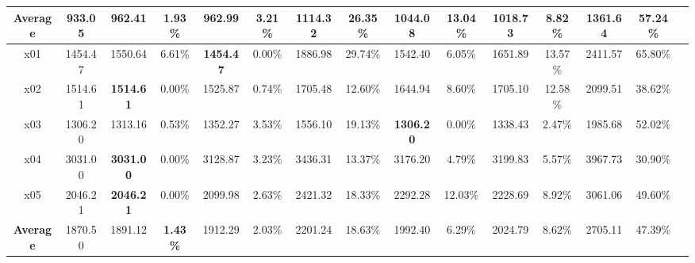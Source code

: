 \begin{table}[h]
{\begin{tabular}{ccccccccccccccc}
				\midrule
				\textbf{Average} & 933.05 & 962.41 & \textbf{1.93\%} & 962.99 & 3.21\% & 1114.32 & 26.35\% & 1044.08 & 13.04\% & 1018.73 & 8.82\% & 1361.64 & 57.24\% \\
				\bottomrule
				\toprule
				x01 & 1454.47 & 1550.64 & 6.61\% & \textbf{1454.47} & 0.00\% & 1886.98 & 29.74\% & 1542.40 & 6.05\% & 1651.89 & 13.57\% & 2411.57 & 65.80\% \\
				x02 & 1514.61 & \textbf{1514.61} & 0.00\% & 1525.87 & 0.74\% & 1705.48 & 12.60\% & 1644.94 & 8.60\% & 1705.10 & 12.58\% & 2099.51 & 38.62\% \\
				x03 & 1306.20 & 1313.16 & 0.53\% & 1352.27 & 3.53\% & 1556.10 & 19.13\% & \textbf{1306.20} & 0.00\% & 1338.43 & 2.47\% & 1985.68 & 52.02\% \\
				x04 & 3031.00 & \textbf{3031.00} & 0.00\% & 3128.87 & 3.23\% & 3436.31 & 13.37\% & 3176.20 & 4.79\% & 3199.83 & 5.57\% & 3967.73 & 30.90\% \\
				x05 & 2046.21 & \textbf{2046.21} & 0.00\% & 2099.98 & 2.63\% & 2421.32 & 18.33\% & 2292.28 & 12.03\% & 2228.69 & 8.92\% & 3061.06 & 49.60\% \\
				\midrule
				\textbf{Average} & 1870.50 & 1891.12 & \textbf{1.43\%} & 1912.29 & 2.03\% & 2201.24 & 18.63\% & 1992.40 & 6.29\% & 2024.79 & 8.62\% & 2705.11 & 47.39\% \\
				\bottomrule
			\end{tabular}
		}

		\label{tab:comparison}
	\end{table}


